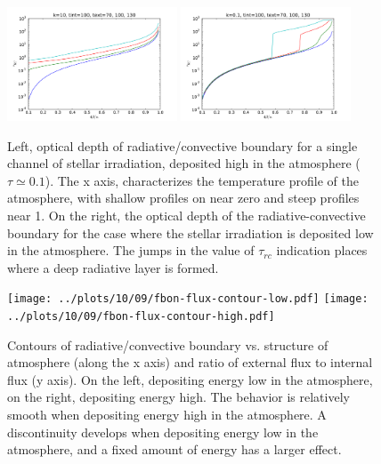 \documentclass{emulateapj}
\begin{document}
\begin{figure}
  \centering
  \includegraphics[width=0.45\textwidth]{taurc-vs-text-high.pdf}
  \hfill
  \includegraphics[width=0.45\textwidth]{taurc-vs-text-low.pdf}
  \caption{Left, optical depth of radiative/convective boundary for a
    single channel of stellar irradiation, deposited high in the
    atmosphere ($\tau\simeq 0.1$).  The x axis, characterizes the
    temperature profile of the atmosphere, with shallow profiles on
    near zero and steep profiles near 1.  On the right, the optical
    depth of the radiative-convective boundary for the case where the
    stellar irradiation is deposited low in the atmosphere.  The jumps
    in the value of $\tau_{rc}$ indication places where a deep
    radiative layer is formed.}
  \label{fig:detached-radiative-zones}
\end{figure}

\begin{figure}
  \centering
  \texttt{[image: ../plots/10/09/fbon-flux-contour-low.pdf]}
  \hfill
  \texttt{[image: ../plots/10/09/fbon-flux-contour-high.pdf]}
  \caption{Contours of radiative/convective boundary vs. structure of
    atmosphere (along the x axis) and ratio of external flux to
    internal flux (y axis).  On the left, depositing energy low in
    the atmosphere, on the right, depositing energy high.  The
    behavior is relatively smooth when depositing energy high in the
    atmosphere.  A discontinuity develops when depositing energy low
    in the atmosphere, and a fixed amount of energy has a larger
    effect.  }
  \label{fig:atmosphere-vs-flux}
\end{figure}
\end{document}
